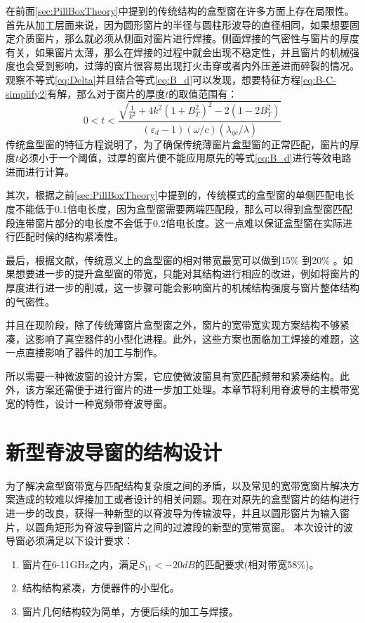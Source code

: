 \documentclass[master]{thesis-uestc}
\begin{document}
在前面\ref{sec:PillBoxTheory}中提到的传统结构的盒型窗在许多方面上存在局限性。首先从加工层面来说，因为圆形窗片的半径与圆柱形波导的直径相同，如果想要固定介质窗片，那么就必须从侧面对窗片进行焊接。侧面焊接的气密性与窗片的厚度有关，如果窗片太薄，那么在焊接的过程中就会出现不稳定性，并且窗片的机械强度也会受到影响，过薄的窗片很容易出现打火击穿或者内外压差进而碎裂的情况。观察不等式\ref{eq:Delta}并且结合等式\ref{eq:B_d}可以发现，想要特征方程\ref{eq:B-C-simplify2}有解，那么对于窗片的厚度$t$的取值范围有：
\begin{equation}\label{eq:t_constraints}
    0 < t < \frac{\sqrt{\frac{1}{k^2}+4k^2(1+B_{T}^2)^2-2(1-2B_{T}^2)}}{(\varepsilon_{d}-1)(\omega / c)(\lambda_{gc} / \lambda)}
\end{equation}
传统盒型窗的特征方程说明了，为了确保传统薄窗片盒型窗的正常匹配，窗片的厚度$t$必须小于一个阈值，过厚的窗片便不能应用原先的等式\ref{eq:B_d}进行等效电路进而进行计算。

其次，根据之前\ref{sec:PillBoxTheory}中提到的，传统模式的盒型窗的单侧匹配电长度不能低于0.1倍电长度，因为盒型窗需要两端匹配段，那么可以得到盒型窗匹配段连带窗片部分的电长度不会低于0.2倍电长度。这一点难以保证盒型窗在实际进行匹配时候的结构紧凑性。

最后，根据文献\cite{huxiongli_bandwidth_pill}，传统意义上的盒型窗的相对带宽最宽可以做到15\% 到20\% 。如果想要进一步的提升盒型窗的带宽，只能对其结构进行相应的改进，例如将窗片的厚度进行进一步的削减，这一步骤可能会影响窗片的机械结构强度与窗片整体结构的气密性。

并且在现阶段，除了传统薄窗片盒型窗之外，窗片的宽带宽实现方案结构不够紧凑，这影响了真空器件的小型化进程。此外，这些方案也面临加工焊接的难题，这一点直接影响了器件的加工与制作。

所以需要一种微波窗的设计方案，它应使微波窗具有宽匹配频带和紧凑结构。此外，该方案还需便于进行窗片的进一步加工处理。本章节将利用脊波导的主模带宽宽的特性，设计一种宽频带脊波导窗。

\section{新型脊波导窗的结构设计}
为了解决盒型窗带宽与匹配结构复杂度之间的矛盾，以及常见的宽带宽窗片解决方案造成的较难以焊接加工或者设计的相关问题。现在对原先的盒型窗片的结构进行进一步的改良，获得一种新型的以脊波导为传输波导，并且以圆形窗片为输入窗片，以圆角矩形为脊波导到窗片之间的过渡段的新型的宽带宽窗。
本次设计的波导窗必须满足以下设计要求：
\begin{enumerate}
    \item 窗片在6-11GHz之内，满足$S_{11}<-20dB$的匹配要求(相对带宽58\%)。
    \item 结构结构紧凑，方便器件的小型化。
    \item 窗片几何结构较为简单，方便后续的加工与焊接。
\end{enumerate}
\end{document}
